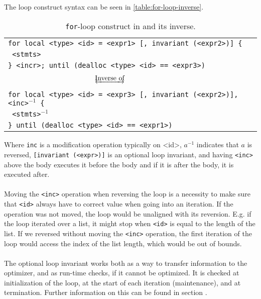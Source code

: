 The loop construct syntax can be seen in \autoref{table:for-loop-inverse}.
\begin{table}[!h]
    \centering
    \begin{tabular}{l}
        \texttt{for local <type> <id> = <expr1> [, invariant (<expr2>)] \{} \\
        \texttt{ <stmts>} \\
        \texttt{\} <incr>; until (dealloc <type> <id> == <expr3>)} \\ \\
        $~~~~~~~~~~~~~~~~~~~~~~~~~~~~~~~~~~~~~\underleftrightarrow{\text{Inverse of}}$ \\ \\
        \texttt{for local <type> <id> = <expr3> [, invariant (<expr2>)], <inc>$^{-1}$ \{ }\\
        \texttt{ <stmts>$^{-1}$} \\
        \texttt{\} until (dealloc <type> <id> == <expr1>)} 
    \end{tabular}
    \caption{\texttt{for}-loop construct in \lan and its inverse.}
    \label{table:for-loop-inverse}
\end{table}
\noindent
Where \texttt{inc} is a modification operation typically on <id>, $a^{-1}$ indicates that
$a$ is reversed, \texttt{[invariant (<expr>)]} is an optional loop invariant, and having
\texttt{<inc>} above the body executes it before the body and if it is after the body, it
is executed after.
\\
\\
Moving the \texttt{<inc>} operation when reversing the loop is a necessity to make sure that
\texttt{<id>} always have to correct value when going into an iteration. If the operation was not
moved, the loop would be unaligned with its reversion. E.g. if the loop iterated over a list,
it might stop when \texttt{<id>} is equal to the length of the list. If we reversed without moving
the \texttt{<inc>} operation, the first iteration of the loop would access the index of the list
length, which would be out of bounds.
\\
\\
The optional loop invariant works both as a way to transfer information to the optimizer, and
as run-time checks, if it cannot be optimized. It is checked at initialization of the loop, at the
start of each iteration (maintenance), and at termination. Further information on this can be found
in section .


